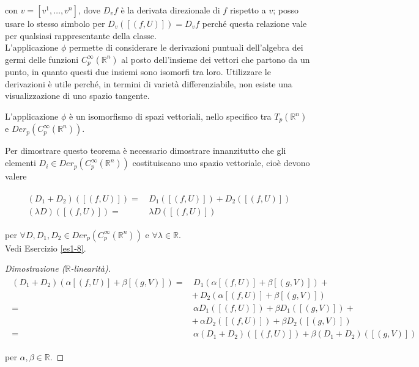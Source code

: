 con $ v = [v^{1},\dots,v^{n}] $, dove $ D_{v} f $ è la derivata direzionale di $ f $ rispetto a $ v $; posso usare lo stesso simbolo per $ D_{v} ([(f,U)]) = D_{v} f $ perché questa relazione vale per qualsiasi rappresentante della classe.\\
L'applicazione $ \phi $ permette di considerare le derivazioni puntuali dell'algebra dei germi delle funzioni $ C_{p}^{\infty}(\mathbb{R}^{n}) $ al posto dell'insieme dei vettori che partono da un punto, in quanto questi due insiemi sono isomorfi tra loro. Utilizzare le derivazioni è utile perché, in termini di varietà differenziabile, non esiste una visualizzazione di uno spazio tangente.

\begin{theorem}
	L'applicazione $ \phi $ è un isomorfismo di spazi vettoriali, nello specifico tra $ T_{p}(\mathbb{R}^{n}) $ e $ Der_{p}(C_{p}^{\infty}(\mathbb{R}^{n})) $.
\end{theorem}

Per dimostrare questo teorema è necessario dimostrare innanzitutto che gli elementi $ D_{i} \in Der_{p}(C_{p}^{\infty}(\mathbb{R}^{n})) $ costituiscano uno spazio vettoriale, cioè devono valere

\begin{align}
	\begin{split}
		(D_{1} + D_{2}) ([(f,U)]) =& \, D_{1}([(f,U)]) + D_{2}([(f,U)])\\
		(\lambda D) ([(f,U)]) =& \, \lambda D ([(f,U)])
	\end{split}
\end{align}

per $ \forall D,D_{1},D_{2} \in Der_{p}(C_{p}^{\infty}(\mathbb{R}^{n})) $ e $ \forall \lambda \in \mathbb{R} $.\\
Vedi Esercizio \ref{es1-8}.

\begin{proof}[Dimostrazione ($ \mathbb{R} $-linearità)]
	\begin{align}
		\begin{split}
			(D_{1} + D_{2}) (\alpha [(f,U)] + \beta [(g,V)]) =& \, D_{1} (\alpha [(f,U)] + \beta [(g,V)]) +\\
			&+ \, D_{2} (\alpha [(f,U)] + \beta [(g,V)])\\
			=& \, \alpha D_{1} ([(f,U)]) + \beta D_{1} ([(g,V)]) +\\
			&+ \,\alpha D_{2} ([(f,U)]) + \beta D_{2} ([(g,V)])\\
			=& \, \alpha (D_{1} + D_{2}) ([(f,U)]) + \beta (D_{1} + D_{2}) ([(g,V)])
		\end{split}
	\end{align}

	per $ \alpha,\beta \in \mathbb{R} $.
\end{proof}

